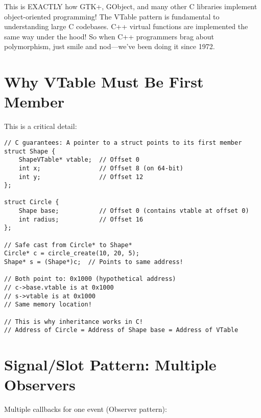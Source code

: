 \begin{notebox}
This is EXACTLY how GTK+, GObject, and many other C libraries implement object-oriented programming! The VTable pattern is fundamental to understanding large C codebases. C++ virtual functions are implemented the same way under the hood! So when C++ programmers brag about polymorphism, just smile and nod—we've been doing it since 1972.
\end{notebox}

\section{Why VTable Must Be First Member}

This is a critical detail:

\begin{lstlisting}
// C guarantees: A pointer to a struct points to its first member
struct Shape {
    ShapeVTable* vtable;  // Offset 0
    int x;                // Offset 8 (on 64-bit)
    int y;                // Offset 12
};

struct Circle {
    Shape base;           // Offset 0 (contains vtable at offset 0)
    int radius;           // Offset 16
};

// Safe cast from Circle* to Shape*
Circle* c = circle_create(10, 20, 5);
Shape* s = (Shape*)c;  // Points to same address!

// Both point to: 0x1000 (hypothetical address)
// c->base.vtable is at 0x1000
// s->vtable is at 0x1000
// Same memory location!

// This is why inheritance works in C!
// Address of Circle = Address of Shape base = Address of VTable
\end{lstlisting}

\section{Signal/Slot Pattern: Multiple Observers}

Multiple callbacks for one event (Observer pattern):

